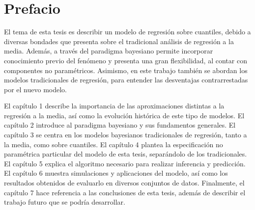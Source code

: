 \pagestyle{plain}
\chapter*{Prefacio}


El tema de esta tesis es describir un modelo de regresi\'on sobre cuantiles, debido a diversas bondades que presenta sobre el tradicional an\'alisis de regresi\'on a la media. Adem\'as, a través del paradigma bayesiano permite incorporar conocimiento previo del fen\'omeno y presenta una gran flexibilidad, al contar con componentes no param\'etricos. Asimismo, en este trabajo tambi\'en se abordan los modelos tradicionales de regresi\'on, para entender las desventajas contrarrestadas por el nuevo modelo.

El cap\'itulo 1 describe la importancia de las aproximaciones distintas a la regresi\'on a la media, así como la evoluci\'on hist\'orica de este tipo de modelos. El cap\'itulo 2 introduce al paradigma bayesiano y sus fundamentos generales. El cap\'itulo 3 se centra en los modelos bayesianos tradicionales de regresi\'on, tanto a la media, como sobre cuantiles. El cap\'itulo 4 plantea la especificaci\'on no param\'etrica particular del modelo de esta tesis, separ\'andolo de los tradicionales. El cap\'itulo 5 explica el algoritmo necesario para realizar inferencia y predicci\'on. El cap\'itulo 6 muestra simulaciones y aplicaciones del modelo, as\'i como los resultados obtenidos de evaluarlo en diversos conjuntos de datos. Finalmente, el cap\'itulo 7 hace referencia a las conclusiones de esta tesis, adem\'as de describir el trabajo futuro que se podr\'ia desarrollar.